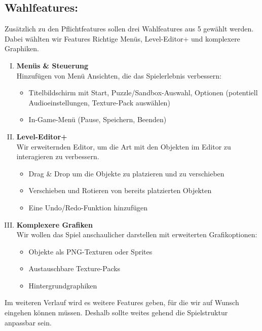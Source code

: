 \documentclass[]{exercise}
\begin{document}
    \subsection{Wahlfeatures:}
        Zusätzlich zu den Pflichtfeatures sollen drei Wahlfeatures aus 5 gewählt werden. Dabei wählten wir Features  Richtige Menüs,  Level-Editor+ und  komplexere Graphiken.
        \begin{enumerate} [I.]
            \item \textbf{Menüs \& Steuerung}\\
                Hinzufügen von Menü Ansichten, die das Spielerlebnis verbessern:
                \begin{itemize}
                    \item Titelbildschirm mit Start, Puzzle/Sandbox-Auswahl, Optionen (potentiell Audioeinstellungen, Texture-Pack auswählen)
                    \item In-Game-Menü (Pause, Speichern, Beenden)
                \end{itemize}
            \item \textbf{Level-Editor+}\\
                Wir erweiternden Editor, um die Art mit den Objekten im Editor zu interagieren zu verbessern.
                \begin{itemize}
                    \item Drag \& Drop um die Objekte zu platzieren und zu verschieben
                    \item Verschieben und Rotieren von bereits platzierten Objekten
                    \item Eine Undo/Redo-Funktion hinzufügen
                \end{itemize}
            \item \textbf{Komplexere Grafiken}\\
                Wir wollen das Spiel anschaulicher darstellen mit erweiterten Grafikoptionen:
                \begin{itemize}
                    \item Objekte als PNG-Texturen oder Sprites
                    \item Austauschbare Texture-Packs
                    \item Hintergrundgraphiken
                \end{itemize}
            \end{enumerate}
            
        Im weiteren Verlauf wird es weitere Features geben, für die wir auf Wunsch eingehen können müssen. Deshalb sollte weites gehend die Spielstruktur anpassbar sein.
\end{document}
